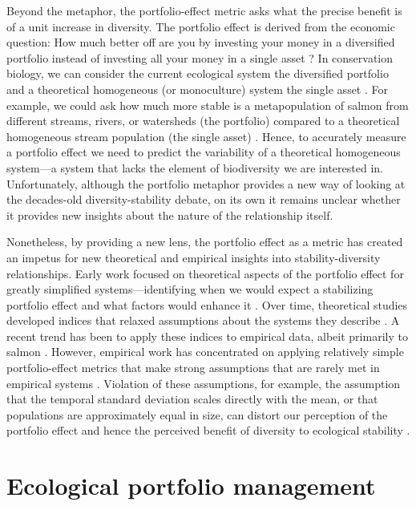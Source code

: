 Beyond the metaphor, the portfolio-effect metric asks what the precise benefit is of a unit increase in diversity. The portfolio effect is derived from the economic question: How much better off are you by investing your money in a diversified portfolio instead of investing all your money in a single asset \citep{markowitz1952}? In conservation biology, we can consider the current ecological system the diversified portfolio and a theoretical homogeneous (or monoculture) system the single asset \citep{anderson2013}. For example, we could ask how much more stable is a metapopulation of salmon from different streams, rivers, or watersheds (the portfolio) compared to a theoretical homogeneous stream population (the single asset) \citep{schindler2010, carlson2011}. Hence, to accurately measure a portfolio effect we need to predict the variability of a theoretical homogeneous system---a system that lacks the element of biodiversity we are interested in. Unfortunately, although the portfolio metaphor provides a new way of looking at the decades-old diversity-stability debate, on its own it remains unclear whether it provides new insights about the nature of the relationship itself.

Nonetheless, by providing a new lens, the portfolio effect as a metric has created an impetus for new theoretical and empirical insights into stability-diversity relationships. Early work focused on theoretical aspects of the portfolio effect for greatly simplified systems---identifying when we would expect a stabilizing portfolio effect and what factors would enhance it \citep{doak1998, tilman1998, lehman2000}. Over time, theoretical studies developed indices that relaxed assumptions about the systems they describe \citep[e.g.][]{loreau2010a, thibaut2013, gross2013}. A recent trend has been to apply these indices to empirical data, albeit primarily to salmon \citep{greene2010, schindler2010, carlson2011, anderson2013, mellin2014}. However, empirical work has concentrated on applying relatively simple portfolio-effect metrics that make strong assumptions that are rarely met in empirical systems \citep{thibaut2013, anderson2013}. Violation of these assumptions, for example, the assumption that the temporal standard deviation scales directly with the mean, or that populations are approximately equal in size, can distort our perception of the portfolio effect and hence the perceived benefit of diversity to ecological stability \citep{anderson2013}.

\section{Ecological portfolio management}\label{ecological-portfolio-management}

